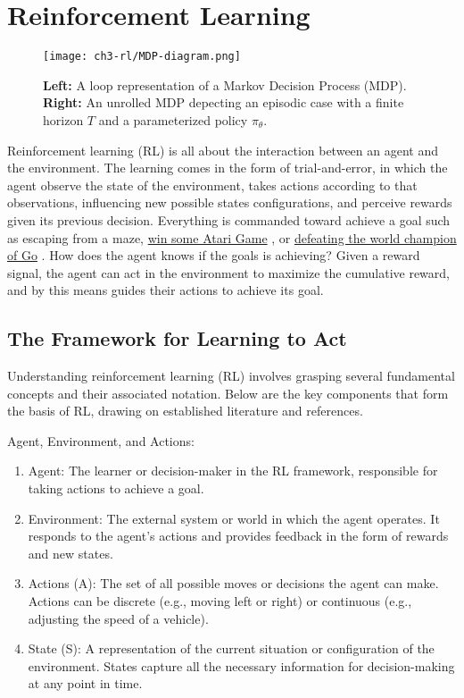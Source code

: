 \chapter{Reinforcement Learning}

\begin{figure}[ht]
    \centering
    \texttt{[image: ch3-rl/MDP-diagram.png]}
    \captionsetup{width=\textwidth} %
    \caption{\textbf{Left:} A loop representation of a Markov Decision Process (MDP). \textbf{Right:} An unrolled MDP depecting an episodic case with a finite horizon $T$ and a parameterized policy $\pi_{\theta}$.}
    \label{fig:mdp-diagram}
  \end{figure}

Reinforcement learning (RL) is all about the interaction between an agent and the environment. The learning comes in the form of trial-and-error, in which the agent observe the state of the environment, takes actions according to that observations, influencing new possible states configurations, and perceive rewards given its previous decision. Everything is commanded toward achieve a goal such as escaping from a maze, \href{https://arxiv.org/abs/1312.5602}{win some Atari Game} \citep{mnih2013playing}, or \href{https://deepmind.google/technologies/alphago/}{defeating the world champion of Go} \citep{silver2016mastering}. How does the agent knows if the goals is achieving? Given a reward signal, the agent can act in the environment to maximize the cumulative reward, and by this means guides their actions to achieve its goal.


\section{The Framework for Learning to Act}


Understanding reinforcement learning (RL) involves grasping several fundamental concepts and their associated notation. Below are the key components that form the basis of RL, drawing on established literature and references.

Agent, Environment, and Actions:
\begin{enumerate}
    \item Agent: The learner or decision-maker in the RL framework, responsible for taking actions to achieve a goal. 
    \item Environment: The external system or world in which the agent operates. It responds to the agent's actions and provides feedback in the form of rewards and new states. 
    \item Actions (A): The set of all possible moves or decisions the agent can make. Actions can be discrete (e.g., moving left or right) or continuous (e.g., adjusting the speed of a vehicle). 
    \item State (S): A representation of the current situation or configuration of the environment. States capture all the necessary information for decision-making at any point in time.
\end{enumerate}


